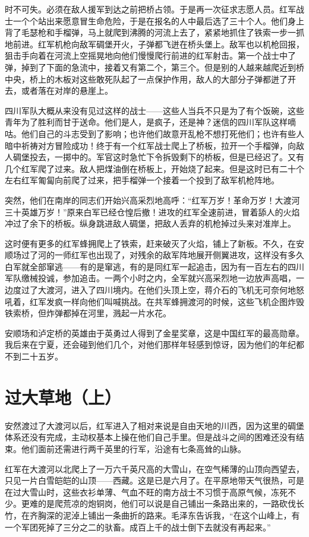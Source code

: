 \documentclass[10pt]{book}
\begin{document}
时不可失。必须在敌人援军到达之前把桥占领。于是再一次征求志愿人员。红军战士一个个站出来愿意冒生命危险，于是在报名的人中最后选了三十个人。他们身上背了毛瑟枪和手榴弹，马上就爬到沸腾的河流上去了，紧紧地抓住了铁索一步一抓地前进。红军机枪向敌军碉堡开火，子弹都飞迸在桥头堡上。敌军也以机枪回报，狙击手向着在河流上空摇晃地向他们慢慢爬行前进的红军射击。第一个战士中了弹，掉到了下面的急流中，接着又有第二个，第三个。但是别的人越来越爬近到桥中央，桥上的木板对这些敢死队起了一点保护作用，敌人的大部分子弹都迸了开去，或者落在对岸的悬崖上。

四川军队大概从来没有见过这样的战士——这些人当兵不只是为了有个饭碗，这些青年为了胜利而甘于送命。他们是人，是疯子，还是神？迷信的四川军队这样嘀咕。他们自己的斗志受到了影响；也许他们故意开乱枪不想打死他们；也许有些人暗中祈祷对方冒险成功！终于有一个红军战士爬上了桥板，拉开一个手榴弹，向敌人碉堡投去，一掷中的。军官这时急忙下令拆毁剩下的桥板，但是已经迟了。又有几个红军爬了过来。敌人把煤油倒在桥板上，开始烧了起来。但是这时已有二十个左右红军匍匐向前爬了过来，把手榴弹一个接着一个投到了敌军机枪阵地。

突然，他们在南岸的同志们开始兴高采烈地高呼：“红军万岁！革命万岁！大渡河三十英雄万岁！”原来白军已经仓惶后撤！进攻的红军全速前进，冒着舔人的火焰冲过了余下的桥板。纵身跳进敌人碉堡，把敌人丢弃的机枪掉过头来对准岸上。

这时便有更多的红军蜂拥爬上了铁索，赶来破灭了火焰，铺上了新板。不久，在安顺场过了河的一师红军也出现了，对残余的敌军阵地展开侧翼进攻，这样没有多久白军就全部窜逃——有的是窜逃，有的是同红军一起追击，因为有一百左右的四川军队缴械投诚，参加追击。一两个小时之内，全军就兴高采烈地一边放声高唱，一边度过了大渡河，进入了四川境内。在他们头顶上空，蒋介石的飞机无可奈何地怒吼着，红军发疯一样向他们叫喊挑战。在共军蜂拥渡河的时候，这些飞机企图炸毁铁索桥，但炸弹都掉在河里，溅起一片水花。

安顺场和泸定桥的英雄由于英勇过人得到了金星奖章，这是中国红军的最高勋章。我后来在宁夏，还会碰到他们几个，对他们那样年轻感到惊讶，因为他们的年纪都不到二十五岁。

\section{过大草地（上）}

安然渡过了大渡河以后，红军进入了相对来说是自由天地的川西，因为这里的碉堡体系还没有完成，主动权基本上操在他们自己手里。但是战斗之间的困难还没有结束。他们面前还需进行两千英里的行军，沿途有七条高耸的山脉。

红军在大渡河以北爬上了一万六千英尺高的大雪山，在空气稀薄的山顶向西望去，只见一片白雪皑皑的山顶——西藏。这是已是六月了。在平原地带天气很热，可是在过大雪山时，这些衣衫单薄、气血不旺的南方战士不习惯于高原气候，冻死不少。更难的是爬荒凉的炮铜岗，他们可以说是自己铺出一条路出来的，一路砍伐长竹，在齐胸深的泥淖上铺出一条曲折的路来。毛泽东告诉我，“在这个山峰上，有一个军团死掉了三分之二的驮畜。成百上千的战士倒下去就没有再起来。”
\end{document}
